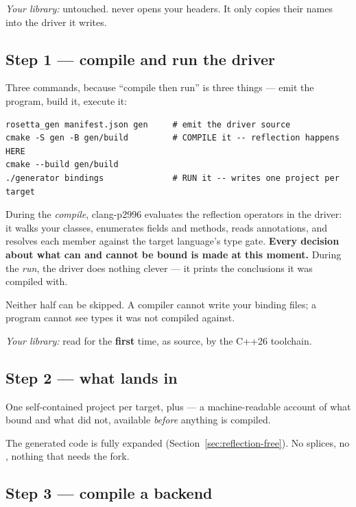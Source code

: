 \emph{Your library:} untouched.  never opens your headers.
It only copies their names into the driver it writes.

\subsection*{Step 1 --- compile and run the driver}

Three commands, because ``compile then run'' is three things --- emit the
program, build it, execute it:

\begin{lstlisting}[style=sh]
rosetta_gen manifest.json gen     # emit the driver source
cmake -S gen -B gen/build         # COMPILE it -- reflection happens HERE
cmake --build gen/build
./generator bindings              # RUN it -- writes one project per target
\end{lstlisting}

During the \emph{compile}, clang-p2996 evaluates the reflection operators in
the driver: it walks your classes, enumerates fields and methods, reads
annotations, and resolves each member against the target language's type gate.
\textbf{Every decision about what can and cannot be bound is made at this
moment.} During the \emph{run}, the driver does nothing clever --- it prints
the conclusions it was compiled with.

Neither half can be skipped. A compiler cannot write your binding files; a
program cannot see types it was not compiled against.

\emph{Your library:} read for the \textbf{first} time, as source, by the C++26
toolchain.

\subsection*{Step 2 --- what lands in }

One self-contained project per target, plus  --- a
machine-readable account of what bound and what did not, available
\emph{before} anything is compiled.

The generated code is fully expanded (Section~\ref{sec:reflection-free}). No
splices, no , nothing that needs the fork.

\subsection*{Step 3 --- compile a backend}


